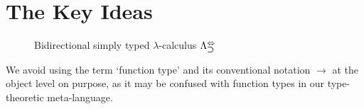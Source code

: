 
\section{The Key Ideas} \label{sec:key-ideas}
\begin{figure}
  \centering
  \small
  \caption{Bidirectional simply typed $\lambda$-calculus $\Lambda^{\Leftrightarrow}_{\mathbin{\bm{\supset}}}$}
  \label{fig:bi-stlc}
\end{figure}
\begin{remark}
  We avoid using the term `function type' and its conventional notation $\to$ at the object level on purpose, as it may be confused with function types in our type-theoretic meta-language.
\end{remark}


